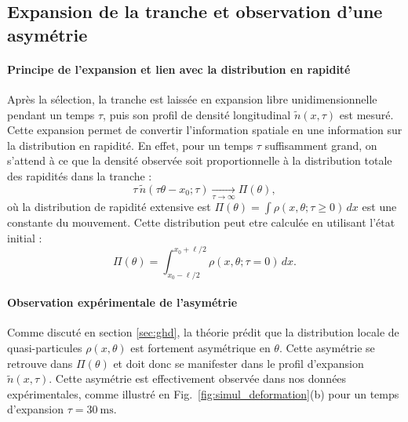 \subsection{Expansion de la tranche et observation d’une asymétrie}

\paragraph{Principe de l’expansion et lien avec la distribution en rapidité}

Après la sélection, la tranche est laissée en expansion libre unidimensionnelle pendant un temps $\tau$, puis son profil de densité longitudinal $\tilde{n}(x,\tau)$ est mesuré. Cette expansion permet de convertir l’information spatiale en une information sur la distribution en rapidité. En effet, pour un temps $\tau$ suffisamment grand, on s’attend à ce que la densité observée soit proportionnelle à la distribution totale des rapidités dans la tranche :
\begin{equation}
\tau\, \tilde{n}(\tau \theta - x_0 ; \tau) \underset{\tau \to \infty}{\longrightarrow} \Pi(\theta),
\end{equation}
où la distribution de rapidité extensive est $\Pi(\theta) = \int \rho(x, \theta ; \tau \geq 0)\, dx $ est une constante du mouvement. Cette distribution peut etre calculée en utilisant l'état initial :
\begin{equation}\label{chap6:eq.Pi.1}
\Pi(\theta)  = \int_{x_0 - \ell/2}^{x_0 + \ell/2} \rho(x, \theta ; \tau = 0)\, dx.
\end{equation}

\paragraph{Observation expérimentale de l’asymétrie}
Comme discuté en section \ref{sec:ghd}, la théorie prédit que la distribution locale de quasi-particules $\rho(x,\theta)$ est fortement asymétrique en $\theta$. Cette asymétrie se retrouve dans $\Pi(\theta)$ et doit donc se manifester dans le profil d’expansion $\tilde{n}(x,\tau)$. Cette asymétrie est effectivement observée dans nos données expérimentales, comme illustré en Fig.~\ref{fig:simul_deformation}(b) pour un temps d’expansion $\tau = 30~\mathrm{ms}$. 


